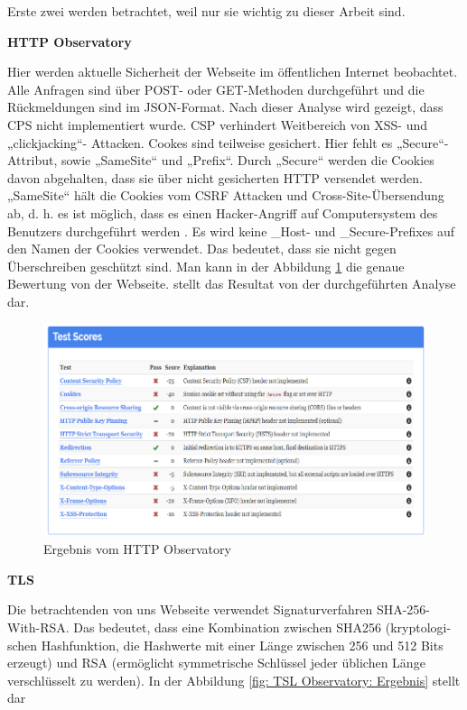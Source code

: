 Erste zwei werden betrachtet, weil nur sie wichtig zu dieser Arbeit sind.

\pagebreak

\textbf{HTTP Observatory}

Hier werden aktuelle Sicherheit der Webseite im öffentlichen Internet beobachtet. Alle Anfragen sind über POST- oder GET-Methoden durchgeführt und die Rückmeldungen sind im JSON-Format.
Nach dieser Analyse wird gezeigt, dass \ac{CPS} nicht implementiert wurde. CSP verhindert Weitbereich von \ac{XSS}- und „clickjacking“- Attacken. 
Cookes sind teilweise gesichert. Hier fehlt es „Secure“-Attribut, sowie „SameSite“ und „Prefix“.  Durch „Secure“ werden die Cookies davon abgehalten, dass sie über nicht gesicherten HTTP versendet werden. „SameSite“ hält die Cookies vom \ac{CSRF} Attacken und Cross-Site-Übersendung ab, d. h. es ist möglich, dass es einen Hacker-Angriff auf Computersystem des Benutzers durchgeführt werden \cite[postnote]{bentley:1999}
. Es wird keine \_Host- und \_Secure-Prefixes auf den Namen der Cookies verwendet. Das bedeutet, dass sie nicht gegen Überschreiben geschützt sind. Man kann in der Abbildung \ref{fig: HTTP Observatory: Ergebnis} die genaue Bewertung von der Webseite.
 stellt das Resultat von der durchgeführten Analyse dar.
 
\begin{figure}[h]
	\centering
	\includegraphics[width=0.7\linewidth]{Graphics/eergebnisobser.png}
	\caption[Egebniss vom HTTP Observatory]{ Ergebnis vom HTTP Observatory }
	\label{fig: HTTP Observatory: Ergebnis}
\end{figure}

\textbf{TLS}

Die betrachtenden von uns Webseite verwendet Signaturverfahren SHA-256-With-RSA. Das bedeutet, dass eine Kombination zwischen SHA256 (kryptologi-schen Hashfunktion, die Hashwerte mit einer Länge zwischen 256 und 512 Bits erzeugt) und \ac{RSA} (ermöglicht symmetrische Schlüssel jeder üblichen Länge verschlüsselt zu werden). In der Abbildung \ref{fig: TSL Observatory: Ergebnis} stellt dar

